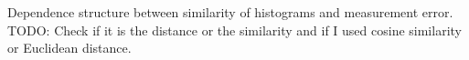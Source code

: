 \label{fig:cor_sim_confi} Dependence structure between similarity of histograms and
    measurement error.
TODO: Check if it is the distance or the similarity and if I used cosine similarity or Euclidean distance.